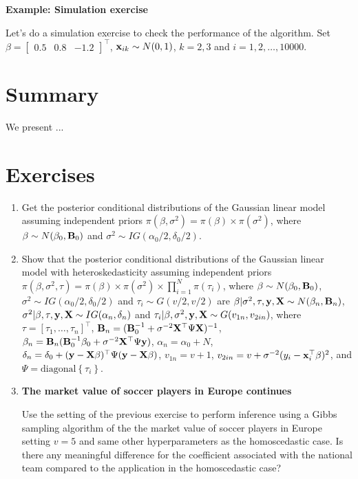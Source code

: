 \textbf{Example: Simulation exercise}

Let's do a simulation exercise to check the performance of the algorithm. Set $\beta=\begin{bmatrix}0.5 & 0.8 & -1.2\end{bmatrix}^{\top}$, ${\bf{x}}_{ik}\sim N(0,1)$, $k=2,3$ and $i=1,2,\dots,10000$.



\section{Summary}\label{sec611}
We present ...

\section{Exercises}\label{sec612}

\begin{enumerate}
	\item Get the posterior conditional distributions of the Gaussian linear model assuming independent priors $\pi(\beta,\sigma^2)=\pi(\beta)\times\pi(\sigma^2)$, where $\beta \sim N(\beta_0, {\bf{B}}_0)$ and $\sigma^2 \sim IG(\alpha_0/2, \delta_0/2)$.
	
	\item Show that the posterior conditional distributions of the Gaussian linear model with heteroskedasticity assuming independent priors $\pi(\beta,\sigma^2,\tau)=\pi(\beta)\times\pi(\sigma^2)\times\prod_{i=1}^N\pi(\tau_i)$, where $\beta \sim N(\beta_0, {\bf{B}}_0)$, $\sigma^2 \sim IG(\alpha_0/2, \delta_0/2)$ and $\tau_i\sim G(v/2,v/2)$ are $\beta|\sigma^2,\tau,{\bf{y}},{\bf{X}}\sim N(\beta_n,{\bf{B}}_n)$, $\sigma^2|\beta,\tau,{\bf{y}},{\bf{X}}\sim IG(\alpha_n,\delta_n)$ and $\tau_i|\beta,\sigma^2,{\bf{y}},{\bf{X}}\sim G(v_{1n},v_{2in})$, where $\tau=[\tau_1,\dots,\tau_n]^{\top}$, ${\bf{B}}_n=({\bf{B}}_0^{-1}+\sigma^{-2}{\bf{X}}^{\top}\Psi{\bf{X}})^{-1}$, $\beta_n={\bf{B}}_n({\bf{B}}_0^{-1}\beta_0+\sigma^{-2}{\bf{X}}^{\top}\Psi{\bf{y}})$, $\alpha_n=\alpha_0+N$, $\delta_n=\delta_0+({\bf{y}}-{\bf{X}}\beta)^{\top}\Psi({\bf{y}}-{\bf{X}}\beta)$, $v_{1n}=v+1$, $v_{2in}=v+\sigma^{-2}(y_i-{\bf{x}}_i^{\top}\beta)^2$, and $\Psi=\text{diagonal}\left\{\tau_i\right\}$.
	
	\item \textbf{The market value of soccer players in Europe continues}
	
	Use the setting of the previous exercise to perform inference using a Gibbs sampling algorithm of the the market value of soccer players in Europe setting $v=5$ and same other hyperparameters as the homoscedastic case. Is there any meaningful difference for the coefficient associated with the national team compared to the application in the homoscedastic case?
	
\end{enumerate}
